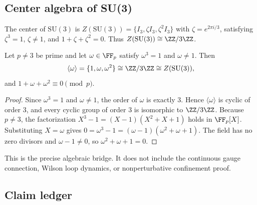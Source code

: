 \subsection{Center algebra of SU(3)}

The center of $\mathrm{SU}(3)$ is $Z(\mathrm{SU}(3)) = \{I_3, \zeta I_3, \zeta^2 I_3\}$ with $\zeta = e^{2\pi i/3}$, satisfying $\zeta^3 = 1$, $\zeta \neq 1$, and $1 + \zeta + \zeta^2 = 0$. Thus $Z(\mathrm{SU}(3)) \cong \ZZ/3\ZZ$.

\begin{theorem}\label{thm:center}
Let $p \neq 3$ be prime and let $\omega \in \FF_p$ satisfy $\omega^3 = 1$ and $\omega \neq 1$. Then
\[
\langle \omega \rangle = \{1, \omega, \omega^2\} \cong \ZZ/3\ZZ \cong Z(\mathrm{SU}(3)),
\]
and $1 + \omega + \omega^2 \equiv 0 \pmod{p}$.
\end{theorem}

\begin{proof}
Since $\omega^3 = 1$ and $\omega \neq 1$, the order of $\omega$ is exactly 3. Hence $\langle \omega \rangle$ is cyclic of order 3, and every cyclic group of order 3 is isomorphic to $\ZZ/3\ZZ$. Because $p \neq 3$, the factorization $X^3 - 1 = (X - 1)(X^2 + X + 1)$ holds in $\FF_p[X]$. Substituting $X = \omega$ gives $0 = \omega^3 - 1 = (\omega - 1)(\omega^2 + \omega + 1)$. The field has no zero divisors and $\omega - 1 \neq 0$, so $\omega^2 + \omega + 1 = 0$. \qedhere
\end{proof}

This is the precise algebraic bridge. It does not include the continuous gauge connection, Wilson loop dynamics, or nonperturbative confinement proof.

\subsection{Claim ledger}

